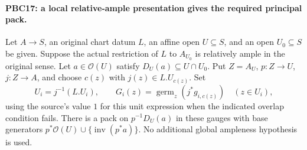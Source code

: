 \paragraph{PBC17: a local relative-ample presentation gives the required principal pack.}
\label{claim:PBC17}
Let $A\to S$, an original chart datum $L$, an affine open
$U\subseteq S$, and an open $U_0\subseteq S$ be given.
Suppose the actual restriction of $L$ to $A_{U_0}$ is
relatively ample in the original sense.
Let $a\in\mathcal O(U)$ satisfy
$D_U(a)\subseteq U\cap U_0$.
Put $Z=A_U$, $p:Z\to U$, $j:Z\to A$, and choose $c(z)$ with
$j(z)\in L.U_{c(z)}$.
Set
\[
 U_i=j^{-1}(L.U_i),\qquad
 G_i(z)=\operatorname{germ}_z(j^*g_{i,c(z)})
                 \quad(z\in U_i),
                                                        \tag{PBC.34}
\]
using the source's value $1$ for this unit expression when the
indicated overlap condition fails.
There is a pack on $p^{-1}D_U(a)$ in these gauges with base
generators $p^*\mathcal O(U)\cup\{\operatorname{inv}(p^*a)\}$.
No additional global ampleness hypothesis is used.

